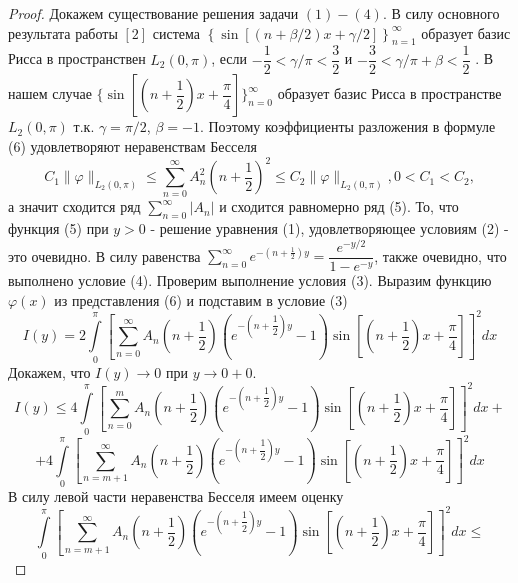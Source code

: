 \documentclass[a4paper, 9pt]{article}
\begin{document}
	
	\begin{proof}
		
	Докажем существование решения задачи $(1) - (4)$. В силу основного результата работы $[2]$ система $\left\{\sin\left[\left(n+\beta/2\right)x + \gamma/2\right]\right\}_{n=1}^{\infty}$ образует базис Рисса в пространствен $L_2(0,\pi)$, если $-\dfrac12 < \gamma/\pi < \dfrac32$ и $-\dfrac32 < \gamma/\pi + \beta < \dfrac12$ . В нашем случае $\{\sin{\left[\left(n + \dfrac12\right)x + \dfrac\pi4\right]}\}_{n=0}^{\infty}$ образует базис Рисса в пространстве $L_2(0, \pi)$ т.к. $\gamma = \pi/2$, $\beta=-1$. Поэтому коэффициенты разложения в формуле (6) удовлетворяют неравенствам Бесселя
	\begin{equation*}
		C_1 \|\varphi \|_{L_2(0,\pi)} \leq \sum\limits_{n=0}^{\infty} A_n^2 \left(n + \dfrac12\right)^2 \leq C_2 \|\varphi \|_{L_2(0,\pi)} , 0 < C_1 < C_2, 
	\end{equation*}
	а значит сходится ряд $\sum\limits_{n=0}^{\infty} |A_n|$ и сходится равномерно ряд (5). То, что функция (5) при $y > 0$ - решение уравнения (1), удовлетворяющее условиям (2) - это очевидно. В силу равенства $\sum\limits_{n=0}^{\infty} e^{-\left(n + \frac12\right)y} = \dfrac{e^{-y/2}}{1 - e^{-y}}$, также очевидно, что выполнено условие (4). Проверим выполнение условия (3).\newline
	Выразим функцию $\varphi(x)$ из представления (6) и подставим в условие (3)
	\begin{equation*}
		I(y) =  2 \int\limits_0^\pi \left[	\sum\limits_{n=0}^{\infty} A_n\left(n+\dfrac12\right) \left( e^{-\left(n+\dfrac12\right)y} - 1\right) \sin{\left[\left(n+\dfrac12\right) x  + \dfrac\pi4\right]} \right]^2 dx
	\end{equation*}
	Докажем, что $I(y) \to 0$ при $y \to 0+0$. 
	\begin{equation*}
		I(y) \leq 4\int\limits_0^\pi \left[	\sum\limits_{n=0}^{m} A_n\left(n+\dfrac12\right) \left( e^{-\left(n+\dfrac12\right)y} - 1\right) \sin{\left[\left(n+\dfrac12\right) x  + \dfrac\pi4\right]} \right]^2 dx + 
	\end{equation*}
	\begin{equation*}
		+ 4\int\limits_0^\pi \left[	\sum\limits_{n=m+1}^{\infty} A_n\left(n+\dfrac12\right) \left( e^{-\left(n+\dfrac12\right)y} - 1\right) \sin{\left[\left(n+\dfrac12\right) x  + \dfrac\pi4\right]} \right]^2 dx
	\end{equation*}
	В силу левой части неравенства Бесселя имеем оценку
	\begin{equation*}
		\int\limits_0^\pi \left[	\sum\limits_{n=m+1}^{\infty} A_n\left(n+\dfrac12\right) \left( e^{-\left(n+\dfrac12\right)y} - 1\right) \sin{\left[\left(n+\dfrac12\right) x  + \dfrac\pi4\right]} \right]^2 dx \leq 

\end{equation*}
\end{proof}
\end{document}
